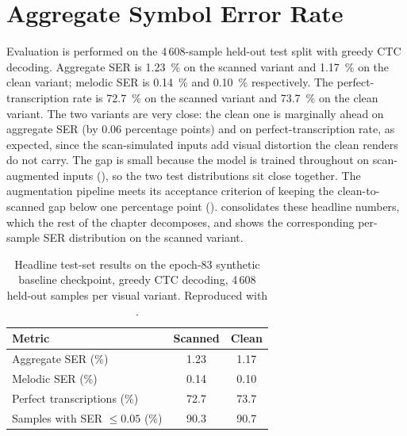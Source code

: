 \section{Aggregate Symbol Error Rate}
\label{sec:res-ser}

Evaluation is performed on the 4\,608-sample held-out test split with
greedy CTC decoding.
Aggregate SER is \SI{1.23}{\percent} on the scanned variant and
\SI{1.17}{\percent} on the clean variant; melodic SER is
\SI{0.14}{\percent} and \SI{0.10}{\percent} respectively.
The perfect-transcription rate is \SI{72.7}{\percent} on the scanned
variant and \SI{73.7}{\percent} on the clean variant.
The two variants are very close: the clean one is marginally ahead on
aggregate SER (by \num{0.06} percentage points) and on
perfect-transcription rate, as expected, since the scan-simulated
inputs add visual distortion the clean renders do not carry.  The gap
is small because the model is trained throughout on scan-augmented
inputs (), so the two test distributions sit close
together.  The augmentation pipeline meets its acceptance criterion of
keeping the clean-to-scanned gap below one percentage point
().
 consolidates these headline numbers, which
the rest of the chapter decomposes, and 
shows the corresponding per-sample SER distribution on the scanned
variant.

\begin{table}[ht]
    \centering
    \caption{Headline test-set results on the epoch-83 synthetic
    baseline checkpoint, greedy CTC decoding,
    4\,608 held-out samples per visual variant.  Reproduced with
    .}
    \label{tab:results-headline}
    \small
    \setlength{\tabcolsep}{6pt}
    \renewcommand{\arraystretch}{1.25}
    \begin{tabular}{@{} l S[table-format=2.2] S[table-format=2.2] @{}}
        \toprule
        \textbf{Metric} & {\textbf{Scanned}} & {\textbf{Clean}} \\
        \midrule
        Aggregate SER (\%)               & 1.23 & 1.17 \\
        Melodic SER (\%)                 & 0.14 & 0.10 \\
        Perfect transcriptions (\%)      & 72.7 & 73.7 \\
        Samples with SER $\le 0.05$ (\%) & 90.3 & 90.7 \\
        \bottomrule
    \end{tabular}
\end{table}

